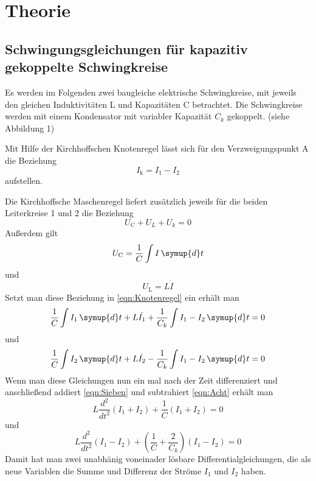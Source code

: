 \section{Theorie}
\label{sec:Theorie}

\subsection{Schwingungsgleichungen für kapazitiv gekoppelte Schwingkreise}
Es werden im Folgenden zwei baugleiche elektrische Schwingkreise, mit jeweils den gleichen Induktivitäten L und Kapazitäten C betrachtet. Die Schwingkreise werden mit 
einem Kondensator mit variabler Kapazität $ C_k $ gekoppelt. (siehe Abbildung 1) %



Mit Hilfe der Kirchhoffschen Knotenregel lässt sich für den Verzweigungspunkt A die Beziehung
\begin{equation}
    I_\text{k} = I_1 - I_2
    \label{eqn:Knotenregel}
\end{equation}
aufstellen.

Die Kirchhoffsche Maschenregel liefert zusätzlich jeweils für die beiden Leiterkreise 1 und 2 die Beziehung
\begin{equation}
    U_\text{C} + U_L + U_k = 0
    \label{eqn:Maschenregel}
\end{equation}
Außerdem gilt
\begin{equation}
    U_\text{C} = \frac{1}{C} \int I \, \symup{d}t
\end{equation}
  und
\begin{equation}
    U_\text{L} = L \dot{I}
\end{equation}
Setzt man diese Beziehung in \ref {eqn:Knotenregel} ein erhält man 
\begin{equation}
    \frac{1}{C} \int I_1 \, \symup{d}t + L \dot{I_1} + \frac{1}{C_k} \int I_1 - I_2 \, \symup{d}t = 0
\end{equation}
und
\begin{equation}
    \frac{1}{C} \int I_2 \, \symup{d}t + L \dot{I_2} - \frac{1}{C_k} \int I_1 - I_2 \, \symup{d}t = 0
\end{equation}
Wenn man diese Gleichungen nun ein mal nach der Zeit differenziert und anschließend addiert \ref {eqn:Sieben} und subtrahiert \ref {eqn:Acht} erhält man
\begin{equation}
    L \frac{d^2}{dt^2}(I_1 + I_2) + \frac{1}{C}(I_1 +I_2) = 0
    \label{eqn:Sieben}
\end{equation}
und
\begin{equation}
    L \frac{d^2}{dt^2}(I_1 - I_2) + ( \frac{1}{C} + \frac{2}{C_k} ) (I_1 - I_2) = 0
    \label{eqn:Acht}
\end{equation}
Damit hat man zwei unabhänig voneinader lösbare Differentialgleichungen, die als neue Variablen die Summe und Differenz der Ströme $ I_1 $ und $ I_2 $ haben.

